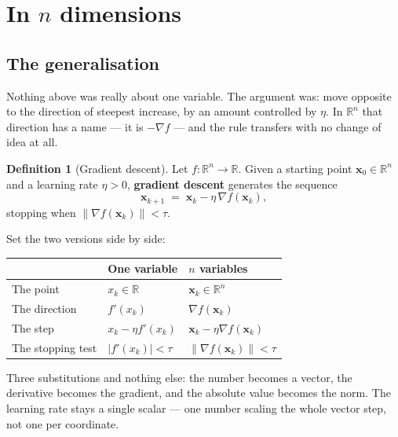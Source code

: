 \documentclass[11pt]{article}
\theoremstyle{plain}
\theoremstyle{definition}
\newtheorem{defn}{Definition}[section]
\theoremstyle{remark}
\newcommand{\R}{\mathbb{R}}
\newcommand{\vc}[1]{\mathbf{#1}}
\newcommand{\norm}[1]{\lVert #1\rVert}
\newcommand{\grad}{\nabla}
\newcommand{\lr}{\eta}
\begin{document}
\section{In \texorpdfstring{$n$}{n} dimensions}

\subsection{The generalisation}
Nothing above was really about one variable. The argument was: move opposite to
the direction of steepest increase, by an amount controlled by $\lr$. In $\R^{n}$
that direction has a name --- it is $-\grad f$ --- and the rule transfers with no
change of idea at all.

\begin{defn}[Gradient descent]
Let $f:\R^{n}\to\R$. Given a starting point $\vc{x}_0\in\R^{n}$ and a learning
rate $\lr>0$, \textbf{gradient descent} generates the sequence
\begin{equation}\label{eq:gdn}
  \vc{x}_{k+1} \;=\; \vc{x}_k - \lr\,\grad f(\vc{x}_k) ,
\end{equation}
stopping when $\norm{\grad f(\vc{x}_k)} < \tau$.
\end{defn}

\noindent Set the two versions side by side:

\begin{center}
\renewcommand{\arraystretch}{1.6}
\begin{tabular}{@{}l l l@{}}
\toprule
 & \textbf{One variable} & \textbf{$n$ variables} \\
\midrule
The point        & $x_k\in\R$        & $\vc{x}_k\in\R^{n}$ \\
The direction    & $f'(x_k)$         & $\grad f(\vc{x}_k)$ \\
The step         & $x_k-\lr f'(x_k)$ & $\vc{x}_k-\lr\grad f(\vc{x}_k)$ \\
The stopping test& $|f'(x_k)|<\tau$  & $\norm{\grad f(\vc{x}_k)}<\tau$ \\
\bottomrule
\end{tabular}
\end{center}

\noindent Three substitutions and nothing else: the number becomes a vector, the
derivative becomes the gradient, and the absolute value becomes the norm. The
learning rate stays a single scalar --- one number scaling the whole vector step,
not one per coordinate.
\end{document}
